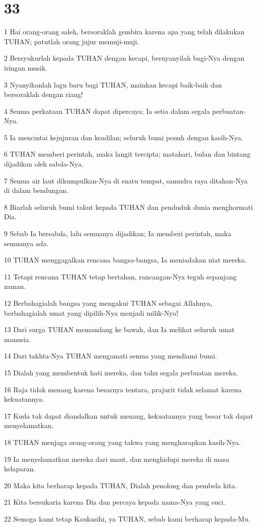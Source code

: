 \chapter{33}

\par 1 Hai orang-orang saleh, bersoraklah gembira karena apa yang telah dilakukan TUHAN; patutlah orang jujur memuji-muji.
\par 2 Bersyukurlah kepada TUHAN dengan kecapi, bernyanyilah bagi-Nya dengan iringan musik.
\par 3 Nyanyikanlah lagu baru bagi TUHAN, mainkan kecapi baik-baik dan bersoraklah dengan riang!
\par 4 Semua perkataan TUHAN dapat dipercaya; Ia setia dalam segala perbuatan-Nya.
\par 5 Ia mencintai kejujuran dan keadilan; seluruh bumi penuh dengan kasih-Nya.
\par 6 TUHAN memberi perintah, maka langit tercipta; matahari, bulan dan bintang dijadikan oleh sabda-Nya.
\par 7 Semua air laut dikumpulkan-Nya di suatu tempat, samudra raya ditahan-Nya di dalam bendungan.
\par 8 Biarlah seluruh bumi takut kepada TUHAN dan penduduk dunia menghormati Dia.
\par 9 Sebab Ia bersabda, lalu semuanya dijadikan; Ia memberi perintah, maka semuanya ada.
\par 10 TUHAN menggagalkan rencana bangsa-bangsa, Ia meniadakan niat mereka.
\par 11 Tetapi rencana TUHAN tetap bertahan, rancangan-Nya teguh sepanjang zaman.
\par 12 Berbahagialah bangsa yang mengakui TUHAN sebagai Allahnya, berbahagialah umat yang dipilih-Nya menjadi milik-Nya!
\par 13 Dari surga TUHAN memandang ke bawah, dan Ia melihat seluruh umat manusia.
\par 14 Dari takhta-Nya TUHAN mengamati semua yang mendiami bumi.
\par 15 Dialah yang membentuk hati mereka, dan tahu segala perbuatan mereka.
\par 16 Raja tidak menang karena besarnya tentara, prajurit tidak selamat karena kekuatannya.
\par 17 Kuda tak dapat diandalkan untuk menang, kekuatannya yang besar tak dapat menyelamatkan.
\par 18 TUHAN menjaga orang-orang yang takwa yang mengharapkan kasih-Nya.
\par 19 Ia menyelamatkan mereka dari maut, dan menghidupi mereka di masa kelaparan.
\par 20 Maka kita berharap kepada TUHAN, Dialah penolong dan pembela kita.
\par 21 Kita bersukaria karena Dia dan percaya kepada nama-Nya yang suci.
\par 22 Semoga kami tetap Kaukasihi, ya TUHAN, sebab kami berharap kepada-Mu.

